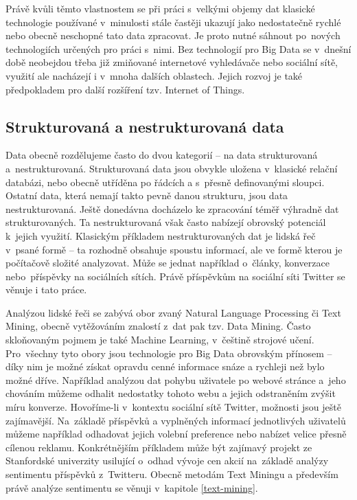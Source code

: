 \documentclass[thesis=B,czech]{FITthesis}[2012/06/26]
\begin{document}
	Právě kvůli těmto vlastnostem se při práci s~velkými objemy dat klasické technologie používané v~minulosti stále častěji ukazují jako nedostatečně rychlé nebo obecně neschopné tato data zpracovat. Je proto nutné sáhnout po~nových technologiích určených pro práci s~nimi. Bez technologií pro Big Data se v~dnešní době neobejdou třeba již zmiňované internetové vyhledávače nebo sociální sítě, využití ale nacházejí i v~mnoha dalších oblastech. Jejich rozvoj je také předpokladem pro další rozšíření tzv. Internet of Things\cite{bigdata-iot}.  

\subsection{Strukturovaná a nestrukturovaná data}	
	Data obecně rozdělujeme často do dvou kategorií -- na data strukturovaná a~nestrukturovaná. Strukturovaná data jsou obvykle uložena v~klasické relační databázi, nebo obecně utříděna po řádcích a s~přesně definovanými sloupci. Ostatní data, která nemají takto pevně danou strukturu, jsou data nestrukturovaná. Ještě donedávna docházelo ke zpracování téměř výhradně dat strukturovaných. Ta nestrukturovaná však často nabízejí obrovský potenciál k~jejich využití. Klasickým příkladem nestrukturovaných dat je lidská řeč v~psané formě -- ta rozhodně obsahuje spoustu informací, ale ve formě kterou je počítačově složité analyzovat. Může se jednat například o~články, konverzace nebo~příspěvky na sociálních sítích.  Právě příspěvkům na sociální síti Twitter se věnuje i tato práce. 
	
	Analýzou lidské řeči se zabývá obor zvaný Natural Language Processing či Text Mining, obecně vytěžováním znalostí z~dat pak tzv. Data Mining. Často skloňovaným pojmem je také Machine Learning, v~češtině strojové učení. Pro~všechny tyto obory jsou technologie pro Big Data obrovským přínosem -- díky nim je možné získat opravdu cenné informace snáze a rychleji než bylo možné dříve. Například analýzou dat pohybu uživatele po webové stránce a~jeho chováním můžeme odhalit nedostatky tohoto webu a jejich odstraněním zvýšit míru konverze. Hovoříme-li v~kontextu sociální sítě Twitter, možnosti jsou ještě zajímavější. Na~základě příspěvků a vyplněných informací jednotlivých uživatelů můžeme například odhadovat jejich volební preference nebo nabízet velice přesně cílenou reklamu. Konkrétnějším příkladem může být zajímavý projekt ze Stanfordské univerzity usilující o~odhad vývoje cen akcií na~základě analýzy sentimentu příspěvků z~Twitteru\cite{stock-stanford}. Obecně metodám Text Miningu a především právě analýze sentimentu se věnuji v~kapitole \ref{text-mining}.  
\end{document}
